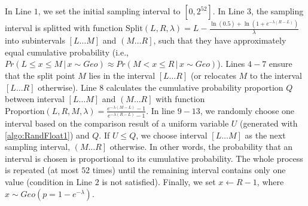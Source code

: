 In Line $1$, we set the initial sampling interval to $\left[0,2^{52}\right] $.
In Line $ 3$, the sampling interval is splitted with function $\text{Split}\left(L,R,\lambda\right)=L-\frac{\ln\left(0.5\right)+\ln\left(1+e^{-\lambda\left(R-L\right) }\right) }{\lambda}$ into subintervals $\left[L\ldots M\right] $ and $\left(M\ldots R\right] $, such that they have approximately equal cumulative probability (i.e., $Pr\left(L\leq x\leq M\,|\, x\sim Geo \right) \approx Pr \left(M  < x  \leq R\,|\, x\sim Geo\right)   $).
Lines $4-7$ ensure that the split point $M$ lies in the interval $[L\ldots R]$ (or relocates $M$ to the interval $[L\ldots R]$ otherwise).
Line $8$ calculates the cumulative probability proportion $Q$ between interval $\left[L\ldots M\right] $ and $\left(M\ldots R\right] $ with function $\text{Proportion}\left(L,R,M,\lambda\right)=\frac{e^{-\lambda\left(M-L\right) }-1}{e^{-\lambda\left(R-L\right) }-1} $.
In line $9-13$, we randomly choose one interval based on the comparison result of a uniform variable $U$ (generated with \autoref{algo:RandFloat1}) and $Q$.
If $U \leq Q$, we choose interval $\left[L\ldots M\right] $ as the next sampling interval, $\left(M\ldots R\right] $ otherwise. In other words, the probability that an interval is chosen is proportional to its cumulative probability.
The whole process is repeated (at most $52$ times) until the remaining interval contains only one value (condition in Line $2$ is not satisfied). Finally, we set $x\gets R-1$, where $x\sim Geo\left(p=1-e^{-\lambda}\right)$.






